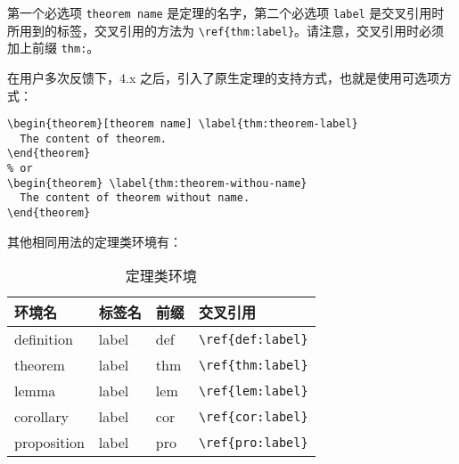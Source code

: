 \documentclass[cn,10pt,math=newtx,citestyle=gb7714-2015,bibstyle=gb7714-2015]{elegantbook}
\begin{document}
第一个必选项 \lstinline{theorem name} 是定理的名字，第二个必选项 \lstinline{label} 是交叉引用时所用到的标签，交叉引用的方法为 \verb|\ref{thm:label}|。请注意，交叉引用时必须加上前缀 \lstinline{thm:}。

在用户多次反馈下，4.x 之后，引入了原生定理的支持方式，也就是使用可选项方式：

\begin{lstlisting}
\begin{theorem}[theorem name] \label{thm:theorem-label}
  The content of theorem.
\end{theorem}
% or 
\begin{theorem} \label{thm:theorem-withou-name}
  The content of theorem without name.
\end{theorem}
\end{lstlisting}

其他相同用法的定理类环境有：

\begin{table}[htbp]
   \centering
   \caption{定理类环境}
     \begin{tabular}{llll}
     \toprule
     环境名 & 标签名 & 前缀 & 交叉引用 \\
     \midrule
     definition & label & def   & \lstinline|\ref{def:label}| \\
     theorem & label & thm   & \lstinline|\ref{thm:label}| \\
     lemma & label & lem   & \lstinline|\ref{lem:label}| \\
     corollary & label & cor   & \lstinline|\ref{cor:label}| \\
     proposition & label & pro   & \lstinline|\ref{pro:label}| \\
     \bottomrule
     \end{tabular}%
   \label{tab:theorem-class}%
 \end{table}%
 
\end{document}

